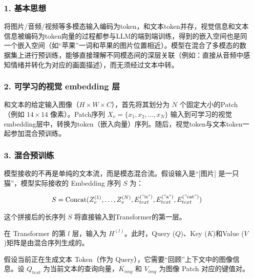 \hypertarget{ux57faux672cux601dux60f3-1}{%
\subsubsection{1. 基本思想}\label{ux57faux672cux601dux60f3-1}}

将图片/音频/视频等多模态输入编码为token，和文本token并存，视觉信息和文本信息被编码为token向量的过程都参与LLM的端到端训练，得到的嵌入空间也是同一个嵌入空间（如``苹果''一词和苹果的图片位置相近）。模型在混合了多模态的数据集上进行预训练，能够直接理解不同模态间的深层关联（例如：直接从音频中感知情绪并转化为对应的画面描述），而无须经过文本中转。

\hypertarget{ux53efux5b66ux4e60ux7684ux89c6ux89c9-embedding-ux5c42}{%
\subsubsection{2. 可学习的视觉 embedding 层}\label{ux53efux5b66ux4e60ux7684ux89c6ux89c9-embedding-ux5c42}}

和文本的给定输入图像（\(H\times W\times C\)），首先将其划分为 \(N\) 个固定大小的Patch（例如 \(14\times14\) 像素）。Patch序列 \(X_v=\{x_1,x_2,\ldots,x_N\}\) 输入到可学习的视觉embedding层中，转换为token（嵌入向量）序列。随后，视觉token与文本token一起参加混合预训练。

\hypertarget{ux6df7ux5408ux9884ux8badux7ec3}{%
\subsubsection{3. 混合预训练}\label{ux6df7ux5408ux9884ux8badux7ec3}}

模型接收的不再是单纯的文本流，而是模态混合流。假设输入是``{[}图片{]} 是一只猫''，模型实际接收的 Embedding 序列 \(S\) 为：

\[
S=\mathrm{Concat}(Z_v^{(1)},\ldots,Z_v^{(N)},E_{text}^{(\mathrm{"is"})},E_{text}^{(\mathrm{"a"})},E_{text}^{(\mathrm{"cat"})})
\]

这个拼接后的长序列 \(S\) 将直接输入到Transformer的第一层。

在 Transformer 的第 \(l\) 层，输入为 \(H^{(l)}\)。此时，Query (\(Q\))、Key (\(K\))和Value (\(V\))矩阵是由混合序列生成的。

假设当前正在生成文本 Token（作为 Query），它需要``回顾''上下文中的图像信息。设 \(Q_{text}\) 为当前文本的查询向量，\(K_{img}\) 和 \(V_{img}\) 为图像 Patch 对应的键值对。

